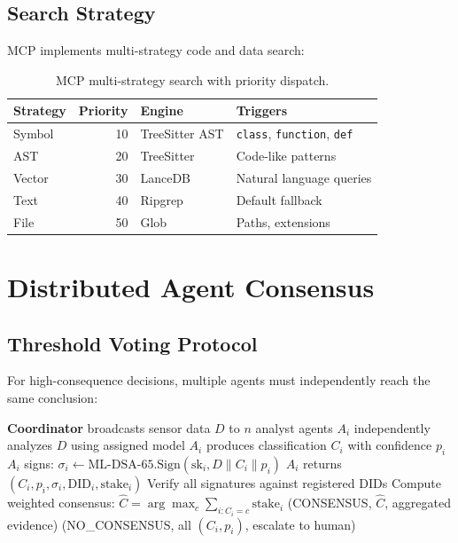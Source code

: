 \documentclass[11pt,letterpaper]{article}
\begin{document}
\subsection{Search Strategy}

MCP implements multi-strategy code and data search:

\begin{table}[H]
\centering
\begin{tabular}{@{}lrlp{3.5cm}@{}}
\toprule
\textbf{Strategy} & \textbf{Priority} & \textbf{Engine} & \textbf{Triggers} \\
\midrule
Symbol & 10 & TreeSitter AST & \texttt{class}, \texttt{function}, \texttt{def} \\
AST & 20 & TreeSitter & Code-like patterns \\
Vector & 30 & LanceDB & Natural language queries \\
Text & 40 & Ripgrep & Default fallback \\
File & 50 & Glob & Paths, extensions \\
\bottomrule
\end{tabular}
\caption{MCP multi-strategy search with priority dispatch.}
\label{tab:search-strategy}
\end{table}

\section{Distributed Agent Consensus}

\subsection{Threshold Voting Protocol}

For high-consequence decisions, multiple agents must independently reach the same conclusion:

\begin{algorithm}[H]
\caption{Agent Consensus for Threat Classification}
\begin{algorithmic}[1]
\State \textbf{Coordinator} broadcasts sensor data $D$ to $n$ analyst agents
  \State $A_i$ independently analyzes $D$ using assigned model
  \State $A_i$ produces classification $C_i$ with confidence $p_i$
  \State $A_i$ signs: $\sigma_i \gets \text{ML-DSA-65.Sign}(\text{sk}_i, D \| C_i \| p_i)$
  \State $A_i$ returns $(C_i, p_i, \sigma_i, \text{DID}_i, \text{stake}_i)$
\EndFor
\State Verify all signatures against registered DIDs
\State Compute weighted consensus: $\hat{C} = \arg\max_c \sum_{i: C_i = c} \text{stake}_i$
  \State \Return (CONSENSUS, $\hat{C}$, aggregated evidence)
\Else
  \State \Return (NO\_CONSENSUS, all $(C_i, p_i)$, escalate to human)
\EndIf
\end{algorithmic}
\end{algorithm}
\end{document}

